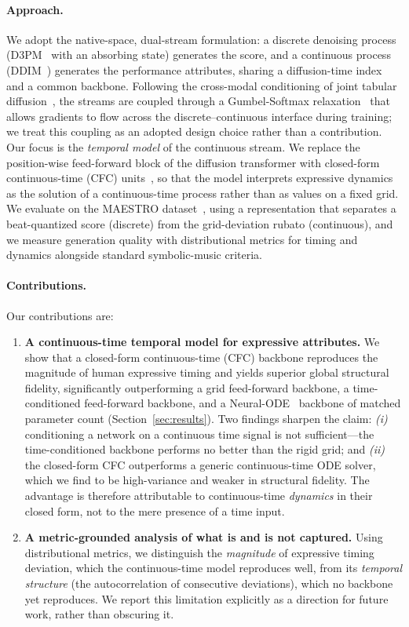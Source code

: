 \documentclass[review]{elsarticle}
\begin{document}
\paragraph{Approach.} We adopt the native-space, dual-stream formulation: a discrete
denoising process (D3PM~\cite{austin2021d3pm} with an absorbing state) generates the
score, and a continuous process (DDIM~\cite{song2021ddim}) generates the performance
attributes, sharing a diffusion-time index and a common backbone. Following the
cross-modal conditioning of joint tabular diffusion~\cite{lee2023codi}, the streams are
coupled through a Gumbel-Softmax relaxation~\cite{jang2017gumbel} that allows gradients
to flow across the discrete--continuous interface during training; we treat this coupling
as an adopted design choice rather than a contribution. Our focus is the
\emph{temporal model} of the continuous stream. We replace the position-wise feed-forward
block of the diffusion transformer with closed-form continuous-time (CFC)
units~\cite{hasani2022cfc, hasani2021ltc}, so that the model interprets expressive
dynamics as the solution of a continuous-time process rather than as values on a fixed
grid. We evaluate on the MAESTRO dataset~\cite{hawthorne2019maestro}, using a
representation that separates a beat-quantized score (discrete) from the grid-deviation
rubato (continuous), and we measure generation quality with distributional metrics for
timing and dynamics alongside standard symbolic-music criteria.

\paragraph{Contributions.} Our contributions are:
\begin{enumerate}
\item \textbf{A continuous-time temporal model for expressive attributes.} We show that a
closed-form continuous-time (CFC) backbone reproduces the magnitude of human
expressive timing and yields superior global structural fidelity, significantly
outperforming a grid feed-forward backbone, a time-conditioned feed-forward backbone, and
a Neural-ODE~\cite{chen2018neuralode} backbone of matched parameter count
(Section~\ref{sec:results}). Two findings sharpen the claim: \emph{(i)} conditioning a
network on a continuous time signal is not sufficient---the time-conditioned backbone
performs no better than the rigid grid; and \emph{(ii)} the closed-form CFC outperforms a
generic continuous-time ODE solver, which we find to be high-variance and weaker in
structural fidelity. The advantage is therefore attributable to continuous-time
\emph{dynamics} in their closed form, not to the mere presence of a time input.
\item \textbf{A metric-grounded analysis of what is and is not captured.} Using
distributional metrics, we distinguish the \emph{magnitude} of expressive timing
deviation, which the continuous-time model reproduces well, from its \emph{temporal
structure} (the autocorrelation of consecutive deviations), which no backbone yet
reproduces. We report this limitation explicitly as a direction for future work, rather
than obscuring it.
\end{enumerate}
\end{document}
